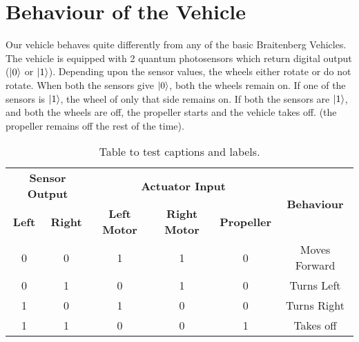 \section{Behaviour of the Vehicle}

Our vehicle behaves quite differently from any of the basic Braitenberg Vehicles. The vehicle is equipped with 2 quantum photosensors which return digital output ($\ket{0}$ or $\ket{1}$). Depending upon the sensor values, the wheels either rotate or do not rotate. When both the sensors give $\ket{0}$, both the wheels remain on. If one of the sensors is $\ket{1}$, the wheel of only that side remains on. If both the sensors are $\ket{1}$, and both the wheels are off, the propeller starts and the vehicle takes off. (the propeller remains off the rest of the time).


    \begin{table}[t]
        \centering
        \begin{tabular}{|cc|ccc|c|}
            \hline
            \multicolumn{2}{|c|}{\textbf{Sensor Output}}         & \multicolumn{3}{c|}{\textbf{Actuator Input}}                                                              & \multirow{2}{*}{\textbf{Behaviour}} \\ \cline{1-5}
            \multicolumn{1}{|c|}{\textbf{Left}} & \textbf{Right} & \multicolumn{1}{c|}{\textbf{Left Motor}} & \multicolumn{1}{c|}{\textbf{Right Motor}} & \textbf{Propeller} &                                     \\ \hline
            \multicolumn{1}{|c|}{0}             & 0              & \multicolumn{1}{c|}{1}                   & \multicolumn{1}{c|}{1}                    & 0                  & Moves Forward                       \\ \hline
            \multicolumn{1}{|c|}{0}             & 1              & \multicolumn{1}{c|}{0}                   & \multicolumn{1}{c|}{1}                    & 0                  & Turns Left                          \\ \hline
            \multicolumn{1}{|c|}{1}             & 0              & \multicolumn{1}{c|}{1}                   & \multicolumn{1}{c|}{0}                    & 0                  & Turns Right                         \\ \hline
            \multicolumn{1}{|c|}{1}             & 1              & \multicolumn{1}{c|}{0}                   & \multicolumn{1}{c|}{0}                    & 1                  & Takes off                           \\ \hline
        \end{tabular}
        \caption{Table to test captions and labels.}
        \label{table:1}
    \end{table}